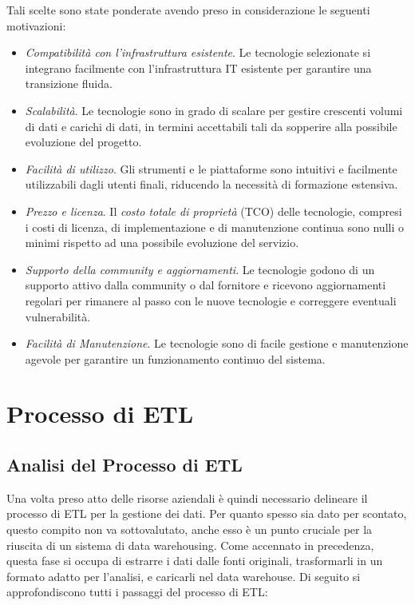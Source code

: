 Tali scelte sono state ponderate avendo preso in considerazione le seguenti motivazioni:
\begin{itemize}
    \item \textit{Compatibilità con l'infrastruttura esistente}. Le tecnologie selezionate si integrano facilmente con l'infrastruttura IT esistente per garantire una transizione fluida.
    \item \textit{Scalabilità}. Le tecnologie sono in grado di scalare per gestire crescenti volumi di dati e carichi di dati, in termini accettabili tali da sopperire alla possibile evoluzione del progetto.
    \item \textit{Facilità di utilizzo}. Gli strumenti e le piattaforme sono intuitivi e facilmente utilizzabili dagli utenti finali, riducendo la necessità di formazione estensiva.
    \item \textit{Prezzo e licenza}. Il \textit{costo totale di proprietà} (TCO) delle tecnologie, compresi i costi di licenza, di implementazione e di manutenzione continua sono nulli o minimi rispetto ad una possibile evoluzione del servizio.
    \item \textit{Supporto della community e aggiornamenti}. Le tecnologie godono di un supporto attivo dalla community o dal fornitore e ricevono aggiornamenti regolari per rimanere al passo con le nuove tecnologie e correggere eventuali vulnerabilità.
    \item \textit{Facilità di Manutenzione}. Le tecnologie sono di facile gestione e manutenzione agevole per garantire un funzionamento continuo del sistema.
\end{itemize}

\section{Processo di ETL}

\subsection{Analisi del Processo di ETL}

Una volta preso atto delle risorse aziendali è quindi necessario delineare il processo di ETL per la gestione dei dati. Per quanto spesso sia dato per scontato, questo compito non va sottovalutato, anche esso è un punto cruciale per la riuscita di un sistema di data warehousing. Come accennato in precedenza, questa fase si occupa di estrarre i dati dalle fonti originali, trasformarli in un formato adatto per l'analisi, e caricarli nel data warehouse. Di seguito si approfondiscono tutti i passaggi del processo di ETL:

